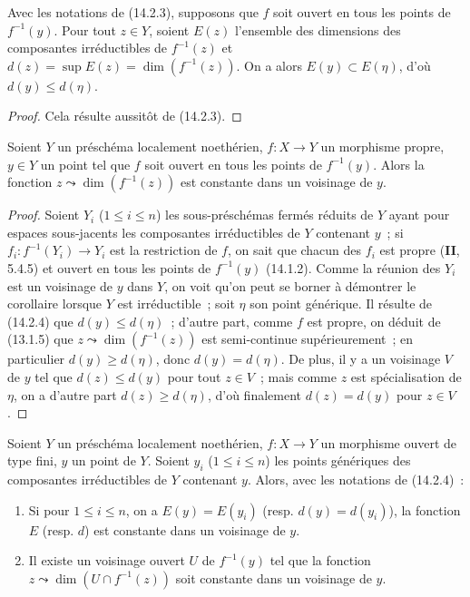 \begin{corollary}[14.2.4]
\label{IV.14.2.4-fr}
Avec les notations de (14.2.3), supposons que $f$ soit ouvert en tous les points
de $f^{-1}(y)$. Pour tout $z\in Y$, soient $E(z)$ l'ensemble des dimensions des
composantes irréductibles de $f^{-1}(z)$ et
$d(z)=\sup E(z)=\dim(f^{-1}(z))$. On a alors $E(y)\subset E(\eta)$, d'où
$d(y)\leq d(\eta)$.
\end{corollary}

\begin{proof}
Cela résulte aussitôt de (14.2.3).
\end{proof}

\begin{corollary}[14.2.5]
\label{IV.14.2.5-fr}
Soient $Y$ un préschéma localement noethérien, $f:X\to Y$ un morphisme propre,
$y\in Y$ un point tel que $f$ soit ouvert en tous les points de $f^{-1}(y)$. Alors
la fonction $z\leadsto\dim(f^{-1}(z))$ est constante dans un voisinage de $y$.
\end{corollary}

\begin{proof}
Soient $Y_i$ ($1\leq i\leq n$) les sous-préschémas fermés réduits de $Y$ ayant
pour espaces sous-jacents les composantes irréductibles de $Y$ contenant $y$~;
si $f_i:f^{-1}(Y_i)\to Y_i$ est la restriction de $f$, on sait que chacun des
$f_i$ est propre (\textbf{II}, 5.4.5) et ouvert en tous les points de $f^{-1}(y)$
(14.1.2). Comme la réunion des $Y_i$ est un voisinage de $y$ dans $Y$,
on voit qu'on peut se borner à démontrer le corollaire lorsque $Y$ est
irréductible~; soit $\eta$ son point générique. Il résulte de (14.2.4) que
$d(y)\leq d(\eta)$~; d'autre part, comme $f$ est propre, on déduit de (13.1.5) que
$z\leadsto\dim(f^{-1}(z))$ est semi-continue supérieurement~; en particulier
$d(y)\geq d(\eta)$, donc $d(y)=d(\eta)$. De plus, il y a un voisinage $V$ de $y$
tel que $d(z)\leq d(y)$ pour tout $z\in V$~; mais comme $z$ est spécialisation de
$\eta$, on a d'autre part $d(z)\geq d(\eta)$, d'où finalement $d(z)=d(y)$ pour
$z\in V$.
\end{proof}

\begin{corollary}[14.2.6]
\label{IV.14.2.6-fr}
Soient $Y$ un préschéma localement noethérien, $f:X\to Y$ un morphisme ouvert de
type fini, $y$ un point de $Y$. Soient $y_i$ ($1\leq i\leq n$) les points
génériques des composantes irréductibles de $Y$ contenant $y$. Alors, avec les
notations de (14.2.4)~:
\begin{enumerate}[label=(\roman*)]
  \item Si pour $1\leq i\leq n$, on a $E(y)=E(y_i)$ \textup{(resp. $d(y)=d(y_i)$)}, la
  fonction $E$ \textup{(resp. $d$)} est constante dans un voisinage de $y$.
  \item Il existe un voisinage ouvert $U$ de $f^{-1}(y)$ tel que la fonction
  $z\leadsto\dim(U\cap f^{-1}(z))$ soit constante dans un voisinage de $y$.
\end{enumerate}
\end{corollary}

